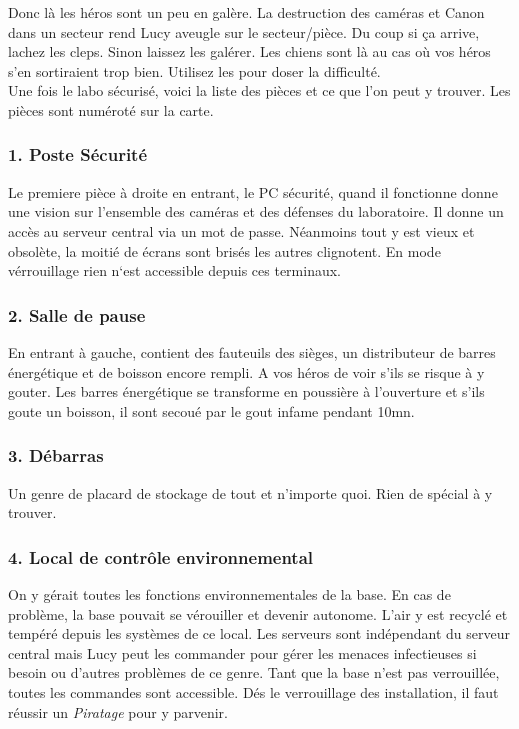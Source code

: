 Donc là les héros sont un peu en galère. La destruction des caméras et Canon dans un secteur rend Lucy aveugle sur le secteur/pièce. Du coup si ça arrive, lachez les cleps. Sinon laissez les galérer. Les chiens sont là au cas où vos héros s’en sortiraient trop bien. Utilisez les pour doser la difficulté.\\

Une fois le labo sécurisé, voici la liste des pièces et ce que l’on peut y trouver. Les pièces sont numéroté sur la carte.

\subsubsection{1. Poste Sécurité}
Le premiere pièce à droite en entrant, le PC sécurité, quand il fonctionne donne une vision sur l’ensemble des caméras et des défenses du laboratoire. Il donne un accès au serveur central via un mot de passe. Néanmoins tout y est vieux et obsolète, la moitié de écrans sont brisés les autres clignotent. En mode vérrouillage rien n`est accessible depuis ces terminaux.

\subsubsection{2. Salle de pause}
En entrant à gauche, contient des fauteuils des sièges, un distributeur de barres énergétique et de boisson encore rempli. A vos héros de voir s'ils se risque à y gouter. Les barres énergétique se transforme en poussière à l’ouverture et s’ils goute un boisson, il sont secoué par le gout infame pendant 10mn.

\subsubsection{3. Débarras}
Un genre de placard de stockage de tout et n’importe quoi. Rien de spécial à y trouver.

\subsubsection{4. Local de contrôle environnemental}
On y gérait toutes les fonctions environnementales de la base. En cas de problème, la base pouvait se vérouiller et devenir autonome. L’air y est recyclé et tempéré depuis les systèmes de ce local. Les serveurs sont indépendant du serveur central mais Lucy peut les commander pour gérer les menaces infectieuses si besoin ou d’autres problèmes de ce genre. Tant que la base n’est pas verrouillée, toutes les commandes sont accessible. Dés le verrouillage des installation, il faut réussir un \textit{Piratage} pour y parvenir.

